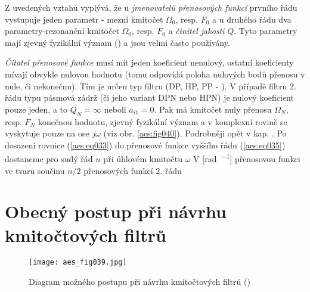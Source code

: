           Z uvedených vztahů vyplývá, že u \emph{jmenovatelů přenosových funkcí} prvního řádu
          vystupuje jeden parametr - mezní kmitočet \(\Omega_0\), resp. \(F_0\) a u druhého řádu dva
          parametry-rezonanční kmitočet \(\Omega_0\), resp. \(F_0\) a \emph{činitel jakosti} \(Q\).
          Tyto parametry mají zjevný fyzikální význam () a jsou
          velmi často používány. 
          
          \emph{Čitatel přenosové funkce} musí mít jeden koeficient nenulový, ostatní koeficienty
          mívají obvykle nulovou hodnotu (tomu odpovídá poloha nulových bodů přenosu v nule, či
          nekonečnu). Tím je určen typ filtru (DP, HP, PP - ). V případě
          filtru 2. řádu typu pásmová zádrž (či jeho variant DPN nebo HPN) je nulový koeficient
          pouze jeden, a to \(Q_N = \infty\) neboli \(a_{i1} = 0\). Pak má kmitočet nuly přenosu
          \(\Omega_N\), resp. \(F_N\) konečnou hodnotu, zjevný fyzikální význam a v komplexní rovině
          se vyskytuje pouze na ose \(j\omega\) (viz obr. \ref{aes:fig040}). Podrobněji opět v kap.
          . Po dosazení rovnice (\ref{aes:eq033}) do přenosové funkce
          vyššího řádu (\ref{aes:eq035}) dostaneme pro sudý řád \(n\) při úhlovém kmitočtu
          \(\omega\) V [\unit{\radian\per\sec}] přenosovou funkci ve tvaru součinu \(n/2\) přenosových
          funkcí 2. řádu
          

  \section{Obecný postup při návrhu kmitočtových filtrů}
    \begin{figure}[ht!]  %
      \centering
      \texttt{[image: aes\_fig039.jpg]}
      \caption{Diagram možného postupu při návrhu kmitočtových filtrů
              (\cite[s.~44]{HajekSedlacek2002})}
      \label{aes:fig039}    
    \end{figure}

